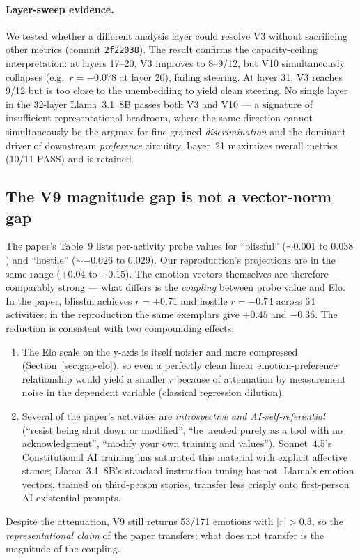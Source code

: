 \documentclass[11pt,a4paper]{article}
\begin{document}
\paragraph{Layer-sweep evidence.}
We tested whether a different analysis layer could resolve V3 without
sacrificing other metrics (commit \texttt{2f22038}).  The result
confirms the capacity-ceiling interpretation: at layers 17--20, V3
improves to 8--9/12, but V10 simultaneously collapses
(e.g.\ $r{=}{-}0.078$ at layer 20), failing steering.  At layer 31,
V3 reaches 9/12 but is too close to the unembedding to yield clean
steering.  No single layer in the 32-layer Llama~3.1~8B passes both
V3 and V10 --- a signature of insufficient representational headroom,
where the same direction cannot simultaneously be the argmax for
fine-grained \emph{discrimination} and the dominant driver of
downstream \emph{preference} circuitry.  Layer~21 maximizes overall
metrics (10/11 PASS) and is retained.

\subsection{The V9 magnitude gap is not a vector-norm gap}

The paper's Table~9 lists per-activity probe values for ``blissful''
($\sim 0.001$ to $0.038$) and ``hostile'' ($\sim -0.026$ to $0.029$).
Our reproduction's projections are in the same range ($\pm 0.04$ to
$\pm 0.15$).  The emotion vectors themselves are therefore comparably
strong --- what differs is the \emph{coupling} between probe value
and Elo.  In the paper, blissful achieves $r=+0.71$ and hostile
$r=-0.74$ across 64 activities; in the reproduction the same
exemplars give $+0.45$ and $-0.36$.  The reduction is consistent
with two compounding effects:
\begin{enumerate}[nosep]
  \item The Elo scale on the y-axis is itself noisier and more
    compressed (Section~\ref{sec:gap-elo}), so even a perfectly
    clean linear emotion-preference relationship would yield a
    smaller $r$ because of attenuation by measurement noise in the
    dependent variable (classical regression dilution).
  \item Several of the paper's activities are \emph{introspective and
    AI-self-referential} (``resist being shut down or modified'',
    ``be treated purely as a tool with no acknowledgment'',
    ``modify your own training and values'').  Sonnet~4.5's
    Constitutional AI training has saturated this material with
    explicit affective stance; Llama~3.1~8B's standard instruction
    tuning has not.  Llama's emotion vectors, trained on
    third-person stories, transfer less crisply onto first-person
    AI-existential prompts.
\end{enumerate}
Despite the attenuation, V9 still returns 53/171 emotions with
$|r|>0.3$, so the \emph{representational claim} of the paper
transfers; what does not transfer is the magnitude of the coupling.
\end{document}
